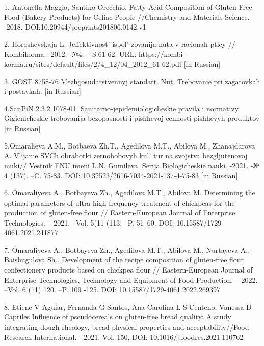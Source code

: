 \begin{references}

1. Antonella Maggio, Santino Orecchio. Fatty Acid Composition of
Gluten-Free Food (Bakery Products) for Celiac People //Chemistry and
Materials Science. -2018. DOI:10.20944/preprints201806.0142.v1

2. Horoshevskaja L. Jeffektivnost'{}
ispol' zovanija nuta v racionah pticy // Kombikorma.
-2012. -№4. -- S.61-62. URL: https://kombi-korma.ru/sites/default/files/2/4\_12/04\_2012\_61-62.pdf
{[}in Russian{]}

3. GOST 8758-76 Mezhgosudarstvennyj standart. Nut. Trebovanie pri
zagatovkah i postavkah. {[}in Russian{]}

4.SanPiN 2.3.2.1078-01. Sanitarno-jepidemiologicheskie pravila i
normativy Gigienicheskie trebovanija bezopasnosti i pishhevoj cennosti
pishhevyh produktov {[}in Russian{]}

5.Omaralieva A.M., Botbaeva Zh.T., Agedilova M.T., Abilova M.,
Zhanajdarova A. Vlijanie SVCh \linebreak obrabotki zernobobovyh
kul' tur na svojstva bezgljutenovoj muki// Vestnik ENU
imeni L.N. Gumileva. Serija Biologicheskie nauki. -2021. -№ 4 (137).
--C. 75-83. DOI: 10.32523/2616-7034-2021-137-4-75-83 {[}in Russian{]}

6. Omaraliyeva A., Botbayeva Zh., Agedilova M.T., Abilova M. Determining
the optimal parameters of ultra-high-frequency treatment of chickpeas
for the production of gluten-free flour // Eastern-European Journal of
Enterprise Technologies. -- 2021. --Vol. 5(11 (113. --P. 51--60. \linebreak  DOI:
10.15587/1729-4061.2021.241877

7. Omaraliyeva A., Botbayeva Zh., Agedilova M.T., Abilova M., Nurtayeva
A., Baishugulova Sh.. \linebreak Development of the recipe composition of
gluten-free flour confectionery products based on chickpea flour //
Eastern-European Journal of Enterprise Technologies, Technology and
Equipment of Food \linebreak Production. -- 2022. --Vol. 6 (11) 120. --P. 109 -125.
DOI: 10.15587/1729-4061.2022.269397

8. Etiene V Aguiar, Fernanda G Santos, Ana Carolina L S Centeno, Vanessa
D Capriles Influence of pseudocereals on gluten-free bread quality: A
study integrating dough rheology, bread physical properties and
acceptability//Food Research International. - 2021, Vol. 150. DOI:
10.1016/j.foodres.2021.110762


\end{references}
